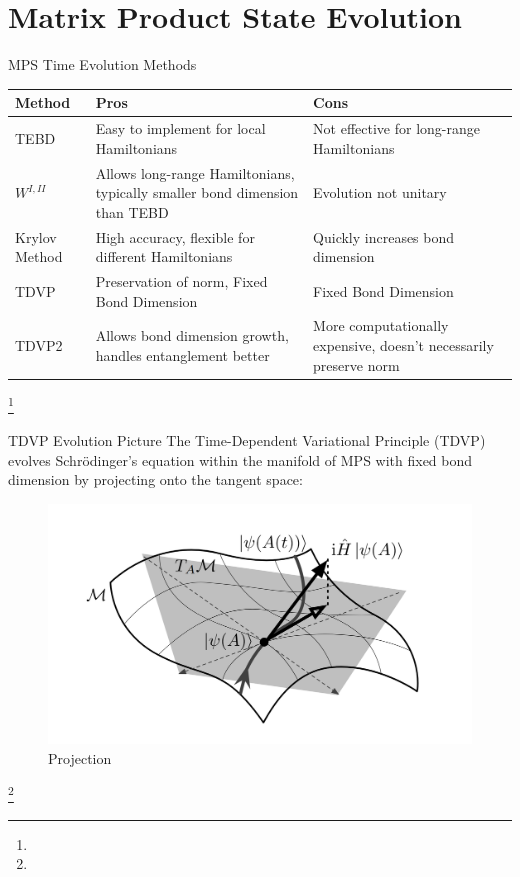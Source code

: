 \documentclass{beamer}
\newcommand\blfootnote[1]{%
  \begingroup
  \renewcommand\thefootnote{}\footnote{#1}%
  \addtocounter{footnote}{-1}%
  \endgroup
}
\begin{document}
\section{Matrix Product State Evolution}

\begin{frame}{MPS Time Evolution Methods}
\small
\begin{tabular}{|p{2cm}|p{4.0cm}|p{4.0cm}|}
\hline
\textbf{Method} & \textbf{Pros} & \textbf{Cons} \\
\hline
TEBD & Easy to implement for local Hamiltonians & Not effective for long-range Hamiltonians\\
\hline
$W^{I, II}$ & Allows long-range Hamiltonians, typically 
smaller bond dimension than TEBD & Evolution not unitary \\
\hline

Krylov Method & High accuracy, flexible for different Hamiltonians & Quickly increases bond dimension\\
\hline
TDVP & Preservation of norm, Fixed Bond Dimension & Fixed Bond Dimension \\
\hline
TDVP2 & Allows bond dimension growth, handles entanglement better & More computationally expensive, doesn't necessarily preserve norm\\
\hline

\end{tabular}
\blfootnote{}
\end{frame}

\begin{frame}{TDVP Evolution Picture}
    \small
    The Time-Dependent Variational Principle (TDVP) evolves Schrödinger's equation within the manifold of MPS with fixed bond dimension by projecting onto the tangent space:
    \begin{figure}
        \centering
        \includegraphics[width=0.8\linewidth]{images/Misc/Manifold.png}
        \caption{Projection}
        \label{fig:Projection}
    \end{figure}
    \blfootnote{}
\end{frame}
\end{document}
